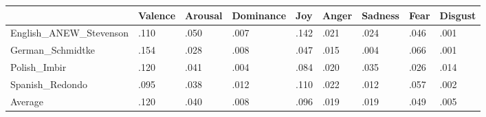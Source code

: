 \begin{tabular}{lllllllll}
\toprule
{} & Valence & Arousal & Dominance &  Joy & Anger & Sadness & Fear & Disgust \\
\midrule
English\_ANEW\_Stevenson &    .110 &    .050 &      .007 & .142 &  .021 &    .024 & .046 &    .001 \\
German\_Schmidtke       &    .154 &    .028 &      .008 & .047 &  .015 &    .004 & .066 &    .001 \\
Polish\_Imbir           &    .120 &    .041 &      .004 & .084 &  .020 &    .035 & .026 &    .014 \\
Spanish\_Redondo        &    .095 &    .038 &      .012 & .110 &  .022 &    .012 & .057 &    .002 \\
Average                &    .120 &    .040 &      .008 & .096 &  .019 &    .019 & .049 &    .005 \\
\bottomrule
\end{tabular}
